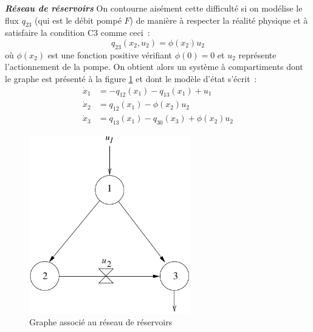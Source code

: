 \begin{exemple}{\bf \em Réseau de réservoirs}
On contourne aisément cette difficulté si on modélise le flux $q_{23}$ (qui est le
débit pompé $F$) de manière à respecter la réalité physique et à satisfaire la
condition C3 comme ceci~:
$$
q_{23}(x_2,u_2) = \phi(x_2)u_2
$$
où $\phi(x_2)$ est une fonction positive vérifiant $\phi(0) = 0$ et
$u_2$ représente l'actionnement de la pompe. On obtient alors un système à
compartiments dont le graphe est présenté à la figure \ref{Fig:graphreseau} et
dont le modèle d'état s'écrit~:
\begin{equation*} \begin{split}
\dot x_1 &= - q_{12}(x_1) - q_{13}(x_1) + u_1 \\
\dot x_2 &=  q_{12}(x_1) - \phi(x_2)u_2 \\
\dot x_3 &= q_{13}(x_1) - q_{30}(x_3) + \phi(x_{2})u_2 
\end{split} \end{equation*}
\begin{figure}[h] 
\begin{center}
\includegraphics[width=7cm]{images/graphreseau}
\caption{Graphe associé au réseau de réservoirs}
\label{Fig:graphreseau}
\end{center} 
\end{figure}
\cqfd
\end{exemple}

